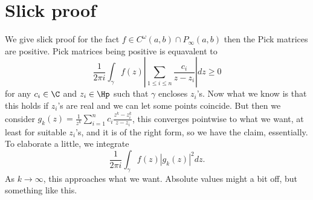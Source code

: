 \begin{comment}

TODO: Start with polynomials.

If $f$ is entire with $f(z) = \sum_{n = 0}^{\infty} a_{n} z^{n}$ we have
\begin{align*}
	f(A + B) &= a_{0} I \\
			&+ a_{1} (A + B) \\
			&+ a_{2} (A^2 + AB + BA + B^2) \\
			&+ a_{3} (A^3 + A^2 B + ABA + AB^2 + BA^2 + BAB + B^2A + B^3) \\
			&+ \ldots
\end{align*}
Hence we have
\begin{align*}
	\lim_{t \to 0} \frac{f(A + tB) - f(A)}{t} &= a_{1} B \\
			&+ a_{2} (AB + BA) \\
			&+ a_{3} (B A^2 + ABA + A^2 B) \\
			&+ a_{4} (B A^{3} + ABA^2 + A^2BA + A^3 B) \\
			&+ \ldots \\
			&= \sum_{n = 1}^{\infty} a_{n} \sum_{0 \leq k \leq n - 1} A^{k} B A^{n - 1 - k}.
\end{align*}

\end{comment}

\section{Slick proof}

We give slick proof for the fact $f \in C^{\omega}(a, b) \cap P_{\infty}(a, b)$ then the Pick matrices are positive. Pick matrices being positive is equavalent to
\[
	\frac{1}{2 \pi i}\int_{\gamma} f(z) \left|\sum_{1 \leq i \leq n}\frac{c_{i}}{z - z_{i}} \right| d z \geq 0
\]
for any $c_{i} \in \C$ and $z_{i} \in \Hp$ such that $\gamma$ encloses $z_{i}$'s. Now what we know is that this holds if $z_{i}$'s are real and we can let some points coincide. But then we consider $g_{k}(z) = \frac{1}{z^{k}}\sum_{i = 1}^{n} c_{i} \frac{z^{k} - z_{i}^{k}}{z - z_{i}}$, this converges pointwise to what we want, at least for suitable $z_{i}$'s, and it is of the right form, so we have the claim, essentially. To elaborate a little, we integrate
\[
	\frac{1}{2 \pi i}\int_{\gamma} f(z) |g_{k}(z)|^{2} dz.
\]
As $k \to \infty$, this approaches what we want. Absolute values might a bit off, but something like this.


